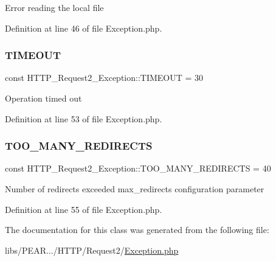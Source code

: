 Error reading the local file 

Definition at line 46 of file Exception.\+php.

\hypertarget{classHTTP__Request2__Exception_a9eff2e63fc4d2ac0e2692610c7709ac9}{}\label{classHTTP__Request2__Exception_a9eff2e63fc4d2ac0e2692610c7709ac9} 
\subsubsection{\texorpdfstring{T\+I\+M\+E\+O\+UT}{TIMEOUT}}
{\footnotesize\ttfamily const H\+T\+T\+P\+\_\+\+Request2\+\_\+\+Exception\+::\+T\+I\+M\+E\+O\+UT = 30}

Operation timed out 

Definition at line 53 of file Exception.\+php.

\hypertarget{classHTTP__Request2__Exception_accfb520aa06566f09fe26138beb3da62}{}\label{classHTTP__Request2__Exception_accfb520aa06566f09fe26138beb3da62} 
\subsubsection{\texorpdfstring{T\+O\+O\+\_\+\+M\+A\+N\+Y\+\_\+\+R\+E\+D\+I\+R\+E\+C\+TS}{TOO\_MANY\_REDIRECTS}}
{\footnotesize\ttfamily const H\+T\+T\+P\+\_\+\+Request2\+\_\+\+Exception\+::\+T\+O\+O\+\_\+\+M\+A\+N\+Y\+\_\+\+R\+E\+D\+I\+R\+E\+C\+TS = 40}

Number of redirects exceeded \textquotesingle{}max\+\_\+redirects\textquotesingle{} configuration parameter 

Definition at line 55 of file Exception.\+php.



The documentation for this class was generated from the following file\+:\begin{DoxyCompactItemize}
\item 
libs/\+P\+E\+A\+R.../\+H\+T\+T\+P/\+Request2/\hyperlink{HTTP_2Request2_2Exception_8php}{Exception.\+php}\end{DoxyCompactItemize}

